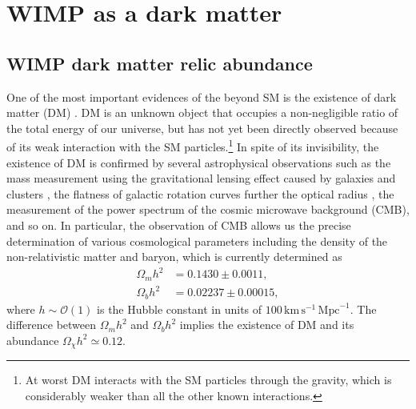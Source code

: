 \documentclass[12pt,twoside,book]{article}
\begin{document}
\section{WIMP as a dark matter}
\setcounter{equation}{0}

\vskip 0.1in

\subsection{WIMP dark matter relic abundance}

One of the most important evidences of the beyond SM is the existence of
dark matter (DM) \cite{Zwicky:1933}.  DM is an unknown object that
occupies a non-negligible ratio of the total energy of our universe, but
has not yet been directly observed because of its weak interaction with
the SM particles.\footnote{
At worst DM interacts with the SM particles through the gravity, which
is considerably weaker than all the other known interactions.
}
In spite of its invisibility, the existence of DM is confirmed by
several astrophysical observations such as the mass measurement using
the gravitational lensing effect caused by galaxies and clusters
\cite{Zwicky:1937, Trimble:1987ee}, the flatness of galactic rotation
curves further the optical radius \cite{1939LicOB..19...41B,
Begeman:1991iy}, the measurement of the power spectrum of the cosmic
microwave background (CMB), and so on.  In particular, the observation
of CMB allows us the precise determination of various cosmological
parameters \cite{Jungman:1995av, Jungman:1995bz} including the density
of the non-relativistic matter and baryon, which is currently
determined as \cite{Aghanim:2018eyx}
\begin{align}
 \Omega_m h^2 &= 0.1430 \pm 0.0011,\\
 \Omega_b h^2 &= 0.02237 \pm 0.00015,
\end{align}
where $h \sim \mathcal{O}(1)$ is the Hubble constant in units of
$100\, \mathrm{km}\, \mathrm{s}^{-1}\, \mathrm{Mpc}^{-1}$.  The
difference between $\Omega_m h^2$ and $\Omega_b h^2$ implies the
existence of DM and its abundance $\Omega_\chi h^2 \simeq 0.12$.
\end{document}
